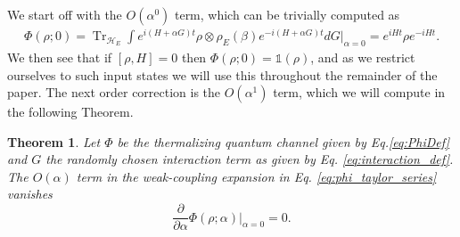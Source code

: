 \documentclass{article}
\newtheorem{theorem}{Theorem}
\newcommand{\bigo}[1]{O\left(#1\right)}
\DeclareMathOperator{\Tr}{Tr}
\newcommand{\hilb}{\mathcal{H}}
\newcommand{\identity}{\mathds{1}}
\begin{document}
We start off with the $\bigo{\alpha^0}$ term, which can be trivially computed as
\begin{align}
\Phi(\rho; 0) = \Tr_{\hilb_E}\int e^{i(H + \alpha G) t} \rho \otimes \rho_E(\beta) e^{-i (H + \alpha G) t} dG \bigg|_{\alpha = 0} = e^{i H t} \rho e^{-i H t}.
\end{align}
We then see that if $[ \rho, H] = 0$ then $\Phi(\rho; 0) = \identity(\rho)$, and as we restrict ourselves to such input states we will use this throughout the remainder of the paper. The next order correction is the $\bigo{\alpha^1}$ term, which we will compute in the following Theorem. 
\begin{theorem} \label{lem:first_order_phi}
Let $\Phi$ be the thermalizing quantum channel given by Eq.\eqref{eq:PhiDef} and $G$ the randomly chosen interaction term as given by Eq. \eqref{eq:interaction_def}. The $O(\alpha)$ term in the weak-coupling expansion in Eq. \eqref{eq:phi_taylor_series} vanishes
   \begin{equation}
        \frac{\partial}{\partial \alpha} \Phi(\rho; \alpha) \big|_{\alpha = 0} = 0.
   \end{equation}
\end{theorem}
\end{document}
